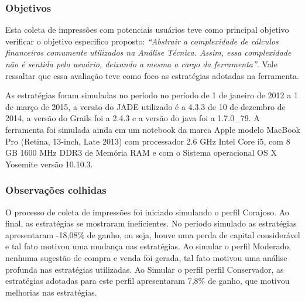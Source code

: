 \subsubsection{Objetivos}

Esta coleta de impressões com potenciais usuários teve como principal objetivo verificar  o objetivo especifico proposto: \textit{“Abstrair a complexidade de cálculos financeiros comumente utilizados na Análise Técnica. Assim, essa complexidade não é sentida pelo usuário, deixando a mesma a cargo da ferramenta”}. Vale ressaltar que essa avaliação teve como foco as estratégias adotadas na ferramenta.

As estratégias foram simuladas no período no período de 1 de janeiro de 2012 a 1 de março de 2015, a versão do JADE utilizado é a 4.3.3 de 10 de dezembro de 2014, a versão do Grails foi a 2.4.3 e a versão do java foi a 1.7.0\_79. A ferramenta foi simulada ainda em um notebook da marca Apple modelo MacBook Pro (Retina, 13-inch, Late 2013) com processador 2.6 GHz Intel Core i5, com 8 GB 1600 MHz DDR3 de Memória RAM e com o Sistema operacional OS X Yosemite versão 10.10.3.

\subsubsection{Observações colhidas}

O processo de coleta de impressões foi iniciado simulando o perfil Corajoso. Ao final, as estratégias se mostraram ineficientes. No periodo simulado as estratégias apresentaram -18,08\% de ganho, ou seja, houve uma perda de capital considerável e tal fato motivou uma mudança nas estratégias. Ao simular o perfil Moderado, nenhuma sugestão de compra e venda foi gerada, tal fato motivou uma análise profunda nas estratégias utilizadas. Ao Simular o perfil perfil Conservador, as estratégias adotadas para este perfil apresentaram 7,8\% de ganho, que motivou melhorias nas estratégias.

